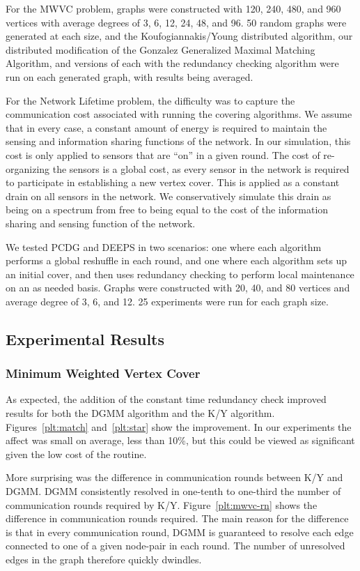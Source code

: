 For the MWVC problem, graphs were constructed with 120, 240, 480, and 960 vertices with average degrees of 3, 6, 12, 24, 48, and 96. 50 random graphs were generated at each size, and the Koufogiannakis/Young distributed algorithm\cite{1582746}, our distributed modification of the Gonzalez Generalized Maximal Matching Algorithm\cite{Gonzalez1995129}, and versions of each with the redundancy checking algorithm were run on each generated graph, with results being averaged.

For the Network Lifetime problem, the difficulty was to capture the communication cost associated with running the covering algorithms. We assume that in every case, a constant amount of energy is required to maintain the sensing and information sharing functions of the network. In our simulation, this cost is only applied to sensors that are ``on'' in a given round. The cost of re-organizing the sensors is a global cost, as every sensor in the network is required to participate in establishing a new vertex cover. This is applied as a constant drain on all sensors in the network. We conservatively simulate this drain as being on a spectrum from free to being equal to the cost of the information sharing and sensing function of the network. 

We tested PCDG and DEEPS in two scenarios: one where each algorithm performs a global reshuffle in each round, and one where each algorithm sets up an initial cover, and then uses redundancy checking to perform local maintenance on an as needed basis. Graphs were constructed with 20, 40, and 80 vertices and average degree of 3, 6, and 12. 25 experiments were run for each graph size.
 
\subsection{Experimental Results}
\label{sub:exp-results}
\subsubsection{Minimum Weighted Vertex Cover}
\label{sub:mwvc-results}
As expected, the addition of the constant time redundancy check improved results for both the DGMM algorithm and the K/Y algorithm. Figures~\ref{plt:match} and~\ref{plt:star} show the improvement. In our experiments the affect was small on average, less than 10\%, but this could be viewed as significant given the low cost of the routine. 


More surprising was the difference in communication rounds between K/Y and DGMM. DGMM consistently resolved in one-tenth to one-third the number of communication rounds required by K/Y. Figure~\ref{plt:mwvc-rn} shows the difference in communication rounds required. The main reason for the difference is that in every communication round, DGMM is guaranteed to resolve each edge connected to one of a given node-pair in each round. The number of unresolved edges in the graph therefore quickly dwindles.


